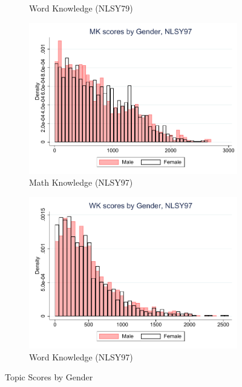 \documentclass[onehalfspacing,11pt]{article}
\begin{document}
\begin{figure}
\begin{subfigure}{0.49\textwidth}
		\caption{Word Knowledge (NLSY79)} \label{fig:nlsy79word}
	\end{subfigure}
		\begin{subfigure}{0.49\textwidth}
		\includegraphics[width=\linewidth]{NLSY97_MK_gender.pdf}
		\caption{Math Knowledge (NLSY97)} \label{fig:nlsy97math}
	\end{subfigure}
	\hspace*{\fill} %
	\begin{subfigure}{0.49\textwidth}
		\includegraphics[width=\linewidth]{NLSY97_WK_gender.pdf}
		\caption{Word Knowledge (NLSY97)} \label{fig:nlsy97wprd}
	\end{subfigure}

	\caption{Topic Scores by Gender}
	\label{fig:nlsy_by_gender}
\end{figure}
\end{document}
